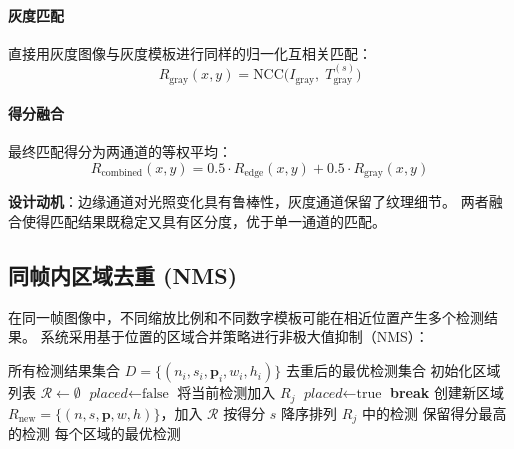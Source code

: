 \documentclass[12pt,a4paper]{article}
\begin{document}
\paragraph{灰度匹配} 直接用灰度图像与灰度模板进行同样的归一化互相关匹配：
\begin{equation}
  R_{\text{gray}}(x, y) = \text{NCC}\bigl(I_{\text{gray}},\; T_{\text{gray}}^{(s)}\bigr)
\end{equation}

\paragraph{得分融合} 最终匹配得分为两通道的等权平均：
\begin{equation}
  R_{\text{combined}}(x, y) = 0.5 \cdot R_{\text{edge}}(x, y) + 0.5 \cdot R_{\text{gray}}(x, y)
  \label{eq:combined_score}
\end{equation}

\textbf{设计动机}：边缘通道对光照变化具有鲁棒性，灰度通道保留了纹理细节。
两者融合使得匹配结果既稳定又具有区分度，优于单一通道的匹配。

\subsection{同帧内区域去重 (NMS)}

在同一帧图像中，不同缩放比例和不同数字模板可能在相近位置产生多个检测结果。
系统采用基于位置的区域合并策略进行非极大值抑制（NMS）：

\begin{algorithm}[H]
\caption{同帧内区域去重}
\label{alg:inframe_nms}
\begin{algorithmic}[1]
\REQUIRE 所有检测结果集合 $D = \{(n_i, s_i, \mathbf{p}_i, w_i, h_i)\}$
\ENSURE 去重后的最优检测集合
\STATE 初始化区域列表 $\mathcal{R} \leftarrow \emptyset$
  \STATE $\textit{placed} \leftarrow \text{false}$
      \STATE 将当前检测加入 $R_j$
      \STATE $\textit{placed} \leftarrow \text{true}$
      \STATE \textbf{break}
    \ENDIF
  \ENDFOR
    \STATE 创建新区域 $R_{\text{new}} = \{(n, s, \mathbf{p}, w, h)\}$，加入 $\mathcal{R}$
  \ENDIF
\ENDFOR
{}
  \STATE 按得分 $s$ 降序排列 $R_j$ 中的检测
  \STATE 保留得分最高的检测
\ENDFOR
\RETURN 每个区域的最优检测
\end{algorithmic}
\end{algorithm}
\end{document}
